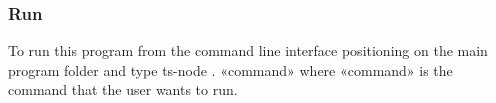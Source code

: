 \subsubsection{Run}
To run this program from the command line interface positioning on the main program folder and type ts-node . «command» where «command» is the command that the user wants to run.
\\
\\

